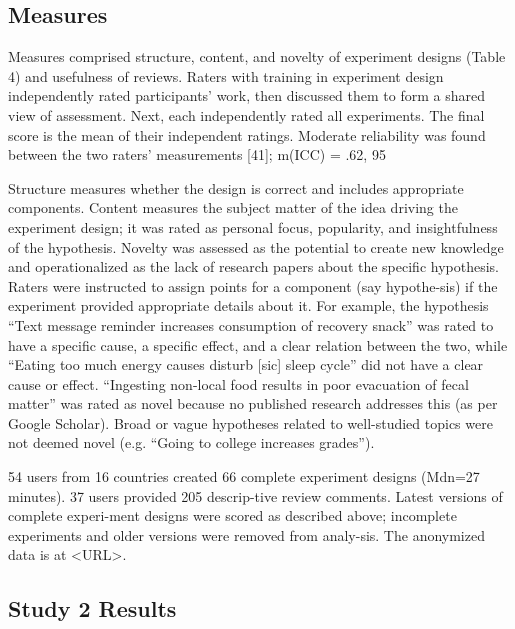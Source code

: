 \subsection{Measures}
Measures comprised structure, content, and novelty of experiment designs (Table 4) and usefulness of reviews. Raters with training in experiment design independently rated participants’ work, then discussed them to form a shared view of assessment. Next, each independently rated all experiments. The final score is the mean of their independent ratings. Moderate reliability was found between the two raters’ measurements [41]; m(ICC) = .62, 95%

Structure measures whether the design is correct and includes appropriate components. Content measures the subject matter of the idea driving the experiment design; it was rated as personal focus, popularity, and insightfulness of the hypothesis. Novelty was assessed as the potential to create new knowledge and operationalized as the lack of research papers about the specific hypothesis. Raters were instructed to assign points for a component (say hypothe-sis) if the experiment provided appropriate details about it. For example, the hypothesis “Text message reminder increases consumption of recovery snack” was rated to have a specific cause, a specific effect, and a clear relation between the two, while “Eating too much energy causes disturb [sic] sleep cycle” did not have a clear cause or effect. “Ingesting non-local food results in poor evacuation of fecal matter” was rated as novel because no published research addresses this (as per Google Scholar). Broad or vague hypotheses related to well-studied topics were not deemed novel (e.g. “Going to college increases grades”).

54 users from 16 countries created 66 complete experiment designs (Mdn=27 minutes). 37 users provided 205 descrip-tive review comments. Latest versions of complete experi-ment designs were scored as described above; incomplete experiments and older versions were removed from analy-sis. The anonymized data is at <URL>. 

\subsection{Study 2 Results}
